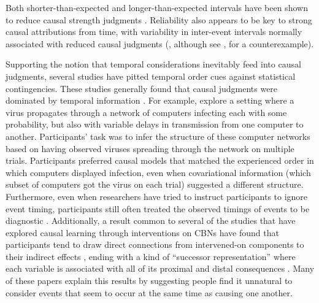 \documentclass{cambridge7A}%
\begin{document}
Both shorter-than-expected and longer-than-expected intervals have been shown to reduce causal strength judgments \citep{buehner2004abolishing, schlottmann1999seeing,buehner2002knowledge,greville2010temporal,hagmayer2002temporal,buehner2003rethinking,greville2016temporal}.  Reliability also appears to be key to strong causal attributions from time, with variability in inter-event intervals normally associated with reduced causal judgments (\citealp{greville2010temporal,lagnado2010influence,greville2013structural}, although see \citealp{young2009problem}, for a counterexample).

Supporting the notion that temporal considerations inevitably feed into causal judgments, several studies have pitted temporal order cues against statistical contingencies.  These studies generally found that causal judgments were dominated by temporal information \citep{lagnado2006time,lagnado2004advantage,burns2009temporal,schlottmann1999seeing,frosch2012causal}.  For example,  \cite{lagnado2006time} explore a setting where a virus propagates through a network of computers infecting each with some probability, but also with variable delays in transmission from one computer to another. Participants' task was to infer the structure of these computer networks based on having observed viruses spreading through the network on multiple trials.  Participants preferred causal models that matched the experienced order in which computers displayed infection, even when covariational information (which subset of computers got the virus on each trial) suggested a different structure.  Furthermore, even when researchers have tried to instruct participants to ignore event timing, participants still often treated the observed timings of events to be diagnostic \citep{white2006structure,mccormack2016children}.  Additionally, a result common to several of the studies that have explored causal learning through interventions on CBNs have found that participants tend to draw direct connections from intervened-on components to their indirect effects \citep{bramley2015fcs, bramley2017neurath, mccormack2016children, fernbach2009causal}, ending with a kind of ``successor representation'' where each variable is associated with all of its proximal and distal consequences \citep{dayan1993improving,momennejad2017successor}.  Many of these papers explain this results by suggesting people find it unnatural to consider events that seem to occur at the same time as causing one another.
\end{document}
